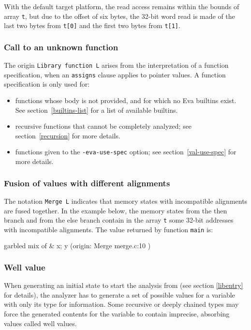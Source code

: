 \documentclass{frama-c-book}
\begin{document}
With the default target platform, the read access remains
within the bounds of array \lstinline|t|,
but due to the offset of six bytes,
the 32-bit word read is made of the last two bytes from \lstinline|t[0]|
and the first two bytes from \lstinline|t[1]|.

\subsubsection{Call to an unknown function}
The origin \lstinline$Library function L$ arises from the interpretation
of a function specification, when an \lstinline|assigns| clause applies to
pointer values.
A function specification is only used for:
\begin{itemize}
\item
  functions whose body is not provided, and for which no Eva builtins
  exist. See section~\ref{builtins-list} for a list of available builtins.
\item
  recursive functions that cannot be completely analyzed;
  see section~\ref{recursion} for more details.
\item
  functions given to the \verb+-eva-use-spec+ option;
  see section~\ref{val-use-spec} for more details.
\end{itemize}

\subsubsection{Fusion of values with different alignments}
The notation \lstinline$Merge L$ indicates that memory states with incompatible
alignments are fused together. In the example below,
the memory states from
the then branch and from the else branch contain in the array
\lstinline|t| some 32-bit addresses with incompatible alignments.
The value returned by function \lstinline|main| is:

\begin{logs}
{{ garbled mix of &{ x; y } (origin: Merge { merge.c:10 }) }}
\end{logs}

\subsubsection{Well value}

When generating an initial state to start the analysis from
(see section \ref{libentry} for details), the analyzer
has to generate a set of
possible values for a variable with only its type for information.
Some recursive or deeply chained types may force the generated
contents for the variable to contain imprecise, absorbing values
called well values.
\end{document}

